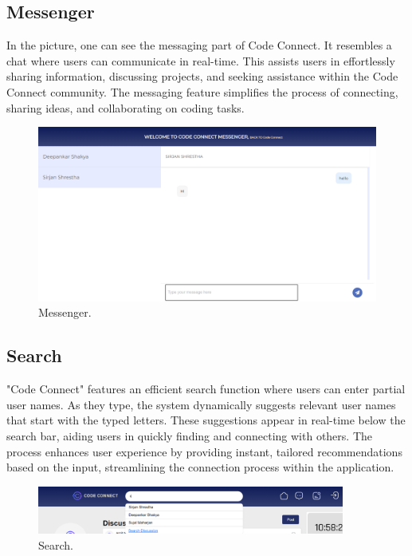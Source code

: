 \subsection{Messenger}
In the picture, one can see the messaging part of Code Connect. It resembles a chat where users can communicate in real-time. This assists users in effortlessly sharing information, discussing projects, and seeking assistance within the Code Connect community. The messaging feature simplifies the process of connecting, sharing ideas, and collaborating on coding tasks.
\begin{figure}[H]
    \centering
    \includegraphics[width=1\textwidth]{Outcome-ss/messenger-full-block.png}
    \caption{Messenger.}
    \label{fig:Messenger}
\end{figure}

\subsection{Search}
"Code Connect" features an efficient search function where users can enter partial user names. As they type, the system dynamically suggests relevant user names that start with the typed letters. These suggestions appear in real-time below the search bar, aiding users in quickly finding and connecting with others. The process enhances user experience by providing instant, tailored recommendations based on the input, streamlining the connection process within the application.
\begin{figure}[H]
    \centering
    \includegraphics[width=0.9\textwidth]{Outcome-ss/search-bar.png}
    \caption{Search.}
    \label{fig:Search}
\end{figure}

